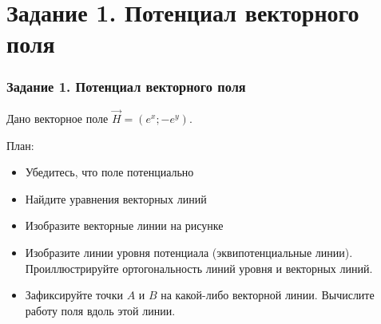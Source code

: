 \section{Задание 1. Потенциал векторного поля}
\begin{frame}\frametitle{Задание 1. Потенциал векторного поля}
  Дано векторное поле \( \vec H = \left( e^x; -e^y \right) \).

План:
\begin{itemize}
  \item Убедитесь, что поле потенциально
  \item Найдите уравнения векторных линий
  \item Изобразите векторные линии на рисунке
  \item Изобразите линии уровня потенциала (эквипотенциальные линии).
  Проиллюстрируйте ортогональность линий уровня и векторных линий.
  \item Зафиксируйте точки \( A \) и \( B \) на какой-либо векторной линии.
  Вычислите работу поля вдоль этой линии.
\end{itemize}
\end{frame}


